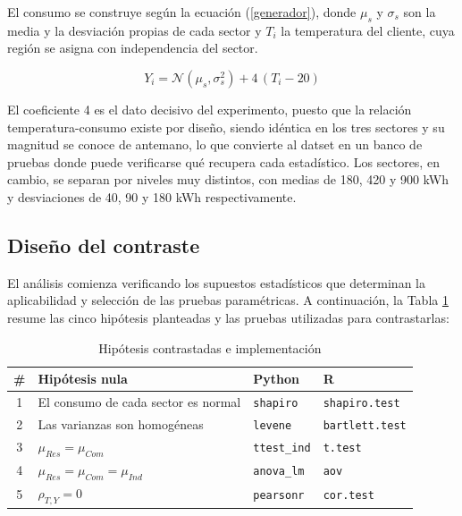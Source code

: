         El consumo se construye según la ecuación (\ref{generador}), donde
        $\mu_s$ y $\sigma_s$ son la media y la desviación propias de cada sector y
        $T_i$ la temperatura del cliente, cuya región se asigna con independencia
        del sector.

        \begin{equation}
            Y_i = \mathcal{N}(\mu_s, \sigma_s^2) + 4\,(T_i - 20)
            \label{generador}
        \end{equation}

        El coeficiente 4 es el dato decisivo del experimento, puesto que la relación
        temperatura-consumo existe por diseño, siendo idéntica en los tres sectores y
        su magnitud se conoce de antemano, lo que convierte al datset en un banco
        de pruebas donde puede verificarse qué recupera cada estadístico. Los
        sectores, en cambio, se separan por niveles muy distintos, con medias de
        180, 420 y 900 kWh y desviaciones de 40, 90 y 180 kWh respectivamente.

    \subsection{Diseño del contraste}
        El análisis comienza verificando los supuestos estadísticos que
        determinan la aplicabilidad y selección de las pruebas paramétricas. A
        continuación, la Tabla \ref{hipotesis} resume las cinco hipótesis
        planteadas y las pruebas utilizadas para contrastarlas:

        \begin{table}[H]
            \centering
            \caption{Hipótesis contrastadas e implementación}
            \begin{center}
                \begin{tabular}{|c|>{\raggedright\arraybackslash}p{2.4cm}|l|l|}
                    \hline
                    \textbf{\#} & \textbf{Hipótesis nula} & \textbf{Python} &
                    \textbf{R} \\
                    \hline
                    1 & El consumo de cada sector es normal & \texttt{shapiro} &
                    \texttt{shapiro.test} \\
                    \hline
                    2 & Las varianzas son homogéneas & \texttt{levene} &
                    \texttt{bartlett.test} \\
                    \hline
                    3 & $\mu_{Res} = \mu_{Com}$ & \texttt{ttest\_ind} &
                    \texttt{t.test} \\
                    \hline
                    4 & $\mu_{Res} = \mu_{Com} = \mu_{Ind}$ & \texttt{anova\_lm} &
                    \texttt{aov} \\
                    \hline
                    5 & $\rho_{T,Y} = 0$ & \texttt{pearsonr} &
                    \texttt{cor.test} \\
                    \hline
                \end{tabular}
                \label{hipotesis}
            \end{center}
        \end{table}


